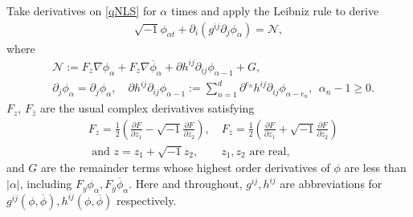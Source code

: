 \documentclass[10pt,twoside,a4paper]{article}
\numberwithin{equation}{section}\allowdisplaybreaks
\def\geq{\geqslant}
\begin{document}
Take derivatives on \eqref{qNLS} for $ \alpha $ times and apply the Leibniz rule  to derive
  	 \begin{align} \label{qNLS1}
  	\sqrt{-1}\phi_{\alpha t}+\partial_i\left( g^{ij} \partial_j \phi_{\alpha }\right)=\mathcal{N},
  \end{align}
	where 
	\begin{align*}
	&	\mathcal{N}:= F_z\nabla \phi_\alpha+F_{\overline{z}}\nabla \overline{\phi}_\alpha+\partial h^{ij}\partial_{ij } \phi_{\alpha -1}+G, \\
	&	\partial_j \phi_{\alpha }=\partial_j \phi_{\alpha } ,\quad \partial h^{ij}\partial_{ij } \phi_{\alpha -1}:=\sum_{n=1}^{d} \partial^{e_n}  h^{ij}\partial_{ij } \phi_{\alpha -e_n}, 
		~~ \alpha_n -1\geq0.\nonumber
	\end{align*}
 	 $F_z$, $F_{\bar{z}}$ are the usual complex derivatives satisfying
	 \begin{align*} 
	 	&F_z=\frac{1}{2}\left(\frac{\partial F}{\partial z_1}-\sqrt{-1} \frac{\partial F}{\partial z_2}\right), \quad  F_{\bar{z}}=\frac{1}{2}\left(\frac{\partial F}{\partial z_1}+\sqrt{-1}\frac{\partial F}{\partial z_2}\right) \\
	 	& \text { and } z=z_1+\sqrt{-1} z_2, \qquad z_1,z_2 \text{ are real},
	 \end{align*}	 
 and  $ G $  are the remainder terms whose  highest order derivatives of $ \phi $   are  less than $ |\alpha|  $, including $ F_y  \phi_\alpha,F_{\bar{y}}  \overline{\phi}_\alpha.$ 
	  Here and throughout,  $  g^{ij}, h^{ij} $  are abbreviations for  $  g^{ij}\left(\phi,\overline{\phi}\right),  h^{ij}\left(\phi,\overline{\phi}\right) $  respectively.
	 
\end{document}
